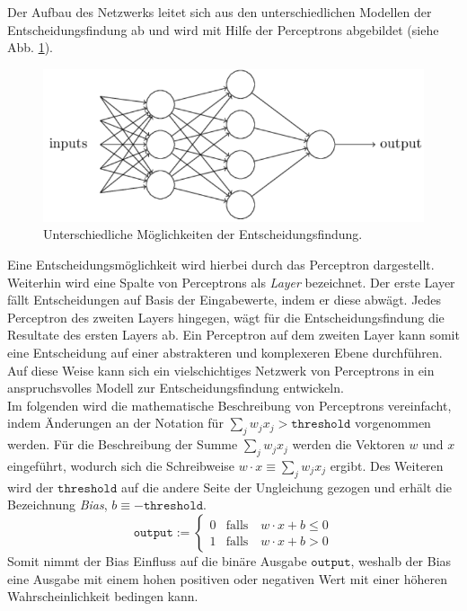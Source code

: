 \noindent
Der Aufbau des Netzwerks leitet sich aus den unterschiedlichen Modellen der Entscheidungsfindung ab und wird mit Hilfe der Perceptrons abgebildet (siehe Abb. \ref{fig:perceptron_models}).
\begin{figure}[hbt]
	\centering
	\includegraphics[scale=0.75]{Bilder/perceptron_models}
	\caption{Unterschiedliche Möglichkeiten der Entscheidungsfindung.} 
	\label{fig:perceptron_models} 
\end{figure}
Eine Entscheidungsmöglichkeit wird hierbei durch das Perceptron dargestellt. Weiterhin wird eine Spalte von Perceptrons als \textit{Layer} bezeichnet. Der erste Layer fällt Entscheidungen auf Basis der Eingabewerte, indem er diese abwägt. Jedes Perceptron des zweiten Layers hingegen, wägt für die Entscheidungsfindung die Resultate des ersten Layers ab. Ein Perceptron auf dem zweiten Layer kann somit eine Entscheidung auf einer abstrakteren und komplexeren Ebene durchführen. Auf diese Weise kann sich ein vielschichtiges Netzwerk von Perceptrons in ein anspruchsvolles Modell zur Entscheidungsfindung entwickeln. \\

\noindent
Im folgenden wird die mathematische Beschreibung von Perceptrons vereinfacht, indem Änderungen an der Notation für $\sum_j w_j x_j > \mathtt{threshold}$ vorgenommen werden. Für die Beschreibung der Summe $\sum_j w_j x_j$ werden die Vektoren $w$ und $x$ eingeführt, wodurch sich die Schreibweise $w \cdot x \equiv \sum_j w_j x_j$ ergibt. Des Weiteren wird der $\mathtt{threshold}$ auf die andere Seite der Ungleichung gezogen und erhält die Bezeichnung \textit{Bias}, $b \equiv \mathtt{-threshold}$. 
\begin{equation}
	\mathtt{output} := \left\{
	\begin{array}{ll}
 		0 & \displaystyle \mbox{falls}\quad w \cdot x + b \leq 0 \\[0.2cm]
 		1 & \displaystyle \mbox{falls}\quad w \cdot x + b > 0
	\end{array}\right.
\end{equation}
Somit nimmt der Bias Einfluss auf die binäre Ausgabe $\mathtt{output}$, weshalb der Bias eine Ausgabe mit einem hohen positiven oder negativen Wert mit einer höheren Wahrscheinlichkeit bedingen kann. \\

